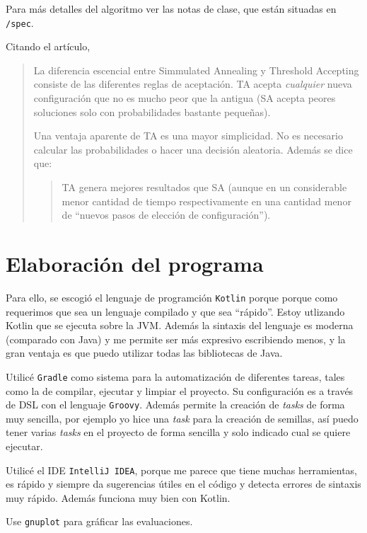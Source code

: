 \documentclass{article}
\begin{document}
Para más detalles del algoritmo ver las notas de clase, que están situadas en \texttt{/spec}.

Citando\cite{DUECK1990161} el artículo,
\begin{quote}
  La diferencia escencial entre Simmulated Annealing y Threshold Accepting consiste de las diferentes
  reglas de aceptación. TA acepta \emph{cualquier} nueva configuración que no es mucho peor que la
  antigua (SA acepta peores soluciones solo con probabilidades bastante pequeñas).

  Una ventaja aparente de TA es una mayor simplicidad. No es necesario calcular las probabilidades
  o hacer una decisión aleatoria. Además se dice que:

  \begin{quotation}
    TA genera mejores resultados que SA (aunque en un considerable menor cantidad de tiempo
    respectivamente en una cantidad menor de ``nuevos pasos de elección de configuración'').
  \end{quotation}
\end{quote}

\section{Elaboración del programa}
Para ello, se escogió el lenguaje de programción \texttt{Kotlin} porque porque como requerimos
que sea un lenguaje compilado y que sea ``rápido''. Estoy utlizando Kotlin que se ejecuta sobre la
JVM. Además la sintaxis del lenguaje es moderna (comparado con Java) y me permite ser más expresivo
escribiendo menos, y la gran ventaja es que puedo utilizar todas las bibliotecas de Java.

Utilicé \texttt{Gradle} como sistema para la automatización de diferentes tareas, tales como la
de compilar, ejecutar y limpiar el proyecto. Su configuración es a través de DSL con el lenguaje
\texttt{Groovy}. Además permite la creación de \textit{tasks} de forma muy sencilla, por ejemplo
yo hice una \textit{task} para la creación de semillas, así puedo tener varias \textit{tasks} en el
proyecto de forma sencilla y solo indicado cual se quiere ejecutar.

Utilicé el IDE \texttt{IntelliJ IDEA}, porque me parece que tiene muchas herramientas, es rápido
y siempre da sugerencias útiles en el código y detecta errores de sintaxis muy rápido. Además
funciona muy bien con Kotlin.

Use \texttt{gnuplot} para gráficar las evaluaciones.
\end{document}
